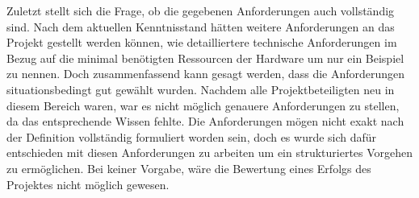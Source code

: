 \documentclass[12pt, a4paper]{report}
\begin{document}
\newline
Zuletzt stellt sich die Frage, ob die gegebenen Anforderungen auch vollständig sind. Nach dem aktuellen Kenntnisstand hätten weitere Anforderungen an das Projekt gestellt werden können, wie detailliertere technische Anforderungen im Bezug auf die minimal benötigten Ressourcen der Hardware um nur ein Beispiel zu nennen. Doch zusammenfassend kann gesagt werden, dass die Anforderungen situationsbedingt gut gewählt wurden. Nachdem alle Projektbeteiligten neu in diesem Bereich waren, war es nicht möglich genauere Anforderungen zu stellen, da das entsprechende Wissen fehlte. Die Anforderungen mögen nicht exakt nach der Definition vollständig formuliert worden sein, doch es wurde sich dafür entschieden mit diesen Anforderungen zu arbeiten um ein strukturiertes Vorgehen zu ermöglichen. Bei keiner Vorgabe, wäre die Bewertung eines Erfolgs des Projektes nicht möglich gewesen. 
\end{document}
